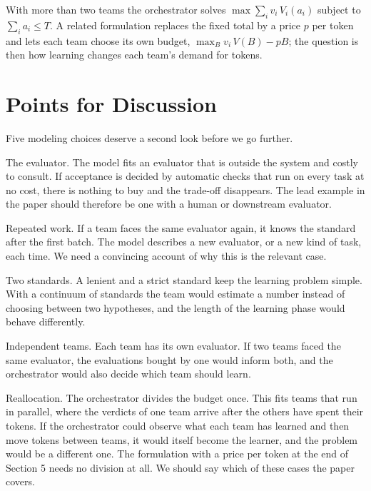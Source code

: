 \documentclass[11pt]{article}
\begin{document}
With more than two teams the orchestrator solves $\max\sum_iv_i\,V_i(a_i)$ subject to $\sum_ia_i\le T$. A related formulation replaces the fixed total by a price $p$ per token and lets each team choose its own budget, $\max_Bv_i\,V(B)-pB$; the question is then how learning changes each team's demand for tokens.

\section{Points for Discussion}

Five modeling choices deserve a second look before we go further.

The evaluator. The model fits an evaluator that is outside the system and costly to consult. If acceptance is decided by automatic checks that run on every task at no cost, there is nothing to buy and the trade-off disappears. The lead example in the paper should therefore be one with a human or downstream evaluator.

Repeated work. If a team faces the same evaluator again, it knows the standard after the first batch. The model describes a new evaluator, or a new kind of task, each time. We need a convincing account of why this is the relevant case.

Two standards. A lenient and a strict standard keep the learning problem simple. With a continuum of standards the team would estimate a number instead of choosing between two hypotheses, and the length of the learning phase would behave differently.

Independent teams. Each team has its own evaluator. If two teams faced the same evaluator, the evaluations bought by one would inform both, and the orchestrator would also decide which team should learn.

Reallocation. The orchestrator divides the budget once. This fits teams that run in parallel, where the verdicts of one team arrive after the others have spent their tokens. If the orchestrator could observe what each team has learned and then move tokens between teams, it would itself become the learner, and the problem would be a different one. The formulation with a price per token at the end of Section 5 needs no division at all. We should say which of these cases the paper covers.
\end{document}
